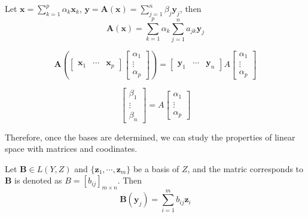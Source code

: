 \documentclass[aps,pra,onecolumn,notitlepage,superscriptaddress]{revtex4-1}
\newcommand{\st}[1]{\mathbf{#1}}
\begin{document}
        Let $\st{x} = \sum_{k=1}^p \alpha_k \st{x}_k$, $\st{y} = \st{A(x)} = \sum_{j=1}^n \beta_j \st{y}_j$, then
        \begin{equation}
            \st{A(x)} = \sum_{k=1}^p \alpha_k \sum_{j=1}^n a_{jk}\st{y}_j
        \end{equation}
        
        \begin{equation}
            \st{A} \left(
                \begin{bmatrix}
                    \st{x}_1 & \cdots & \st{x}_p
                \end{bmatrix}
                \begin{bmatrix}
                    \alpha_1 \\ \vdots \\ \alpha_p
                \end{bmatrix}
            \right) = 
            \begin{bmatrix}
                \st{y}_1 & \cdots & \st{y}_n
            \end{bmatrix}
            A
            \begin{bmatrix}
                \alpha_1 \\ \vdots \\ \alpha_p
            \end{bmatrix}
        \end{equation}

        \begin{equation}
            \begin{bmatrix}
                \beta_1 \\ \vdots \\ \beta_n
            \end{bmatrix}
            = A
            \begin{bmatrix}
                \alpha_1 \\ \vdots \\ \alpha_p
            \end{bmatrix}
        \end{equation}

        Therefore, once the bases are determined, we can study the properties of linear space with matrices and coodinates.

        Let $\st{B} \in L(Y,Z)$ and $\{ \st{z}_1,\cdots, \st{z}_m \}$ be a basis of $Z$, and the matric corresponds to $\st{B}$ is denoted as $B = [b_{ij}]_{m \times n}$. Then
        \begin{equation}
            \st{B}(\st{y}_j) = \sum_{i=1}^m b_{ij}\st{z}_i
        \end{equation}
\end{document}
